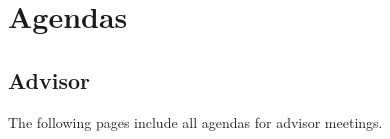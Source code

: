 \chapter{Agendas}

\section{Advisor}\label{se:adag}
The following pages include all agendas for advisor meetings.
\newpage
\begin{figure}[htb]

\end{figure}

\newpage

\begin{figure}[htb]

\end{figure}

\newpage

\begin{figure}[htb]

\end{figure}

\newpage

\begin{figure}[htb]

\end{figure}

\newpage

\begin{figure}[htb]

\end{figure}

\newpage

\begin{figure}[htb]

\end{figure}

\newpage

\begin{figure}[htb]

\end{figure}

\newpage

\begin{figure}[htb]

\end{figure}

\newpage

\begin{figure}[htb]

\end{figure}

